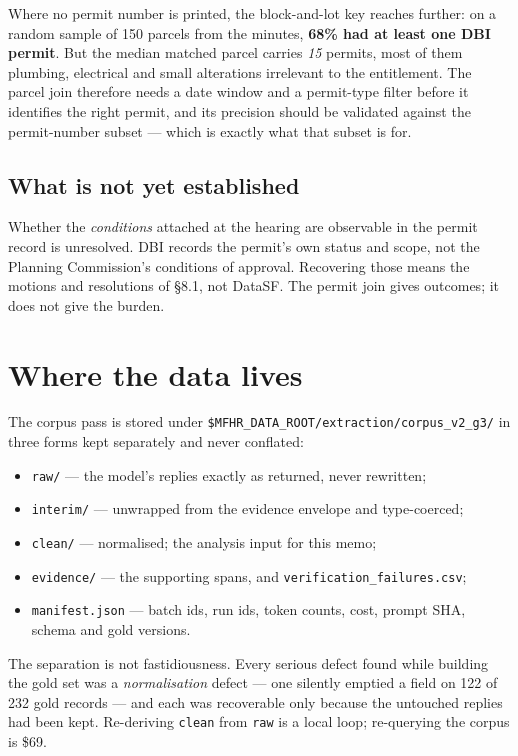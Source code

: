 \documentclass[11pt]{article}
\begin{document}
Where no permit number is printed, the block-and-lot key reaches further: on a random sample
of 150 parcels from the minutes, \textbf{68\% had at least one DBI permit}. But the median
matched parcel carries \emph{15} permits, most of them plumbing, electrical and small
alterations irrelevant to the entitlement. The parcel join therefore needs a date window and a
permit-type filter before it identifies the right permit, and its precision should be
validated against the permit-number subset --- which is exactly what that subset is for.

\subsection{What is not yet established}

Whether the \emph{conditions} attached at the hearing are observable in the permit record is
unresolved. DBI records the permit's own status and scope, not the Planning Commission's
conditions of approval. Recovering those means the motions and resolutions of \S8.1, not
DataSF. The permit join gives outcomes; it does not give the burden.

\section{Where the data lives}

The corpus pass is stored under \verb|$MFHR_DATA_ROOT/extraction/corpus_v2_g3/| in three forms
kept separately and never conflated:

\begin{itemize}
\item \texttt{raw/} --- the model's replies exactly as returned, never rewritten;
\item \texttt{interim/} --- unwrapped from the evidence envelope and type-coerced;
\item \texttt{clean/} --- normalised; the analysis input for this memo;
\item \texttt{evidence/} --- the supporting spans, and \texttt{verification\_failures.csv};
\item \texttt{manifest.json} --- batch ids, run ids, token counts, cost, prompt SHA, schema and
gold versions.
\end{itemize}

The separation is not fastidiousness. Every serious defect found while building the gold set
was a \emph{normalisation} defect --- one silently emptied a field on 122 of 232 gold records
--- and each was recoverable only because the untouched replies had been kept. Re-deriving
\texttt{clean} from \texttt{raw} is a local loop; re-querying the corpus is \$69.
\end{document}
